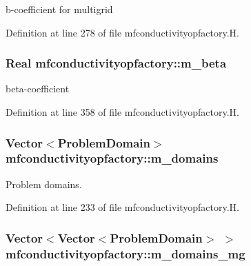 b-\/coefficient for multigrid 



Definition at line 278 of file mfconductivityopfactory.\+H.

\subsubsection[{\texorpdfstring{m\+\_\+beta}{m_beta}}]{\setlength{\rightskip}{0pt plus 5cm}Real mfconductivityopfactory\+::m\+\_\+beta\hspace{0.3cm}{\ttfamily [protected]}}\hypertarget{classmfconductivityopfactory_a84e9034b87544fd055c7568f69e6e1d6}{}\label{classmfconductivityopfactory_a84e9034b87544fd055c7568f69e6e1d6}


beta-\/coefficient 



Definition at line 358 of file mfconductivityopfactory.\+H.

\subsubsection[{\texorpdfstring{m\+\_\+domains}{m_domains}}]{\setlength{\rightskip}{0pt plus 5cm}Vector$<$Problem\+Domain$>$ mfconductivityopfactory\+::m\+\_\+domains\hspace{0.3cm}{\ttfamily [protected]}}\hypertarget{classmfconductivityopfactory_a7f808b27a90660d2912fd5c47da676f4}{}\label{classmfconductivityopfactory_a7f808b27a90660d2912fd5c47da676f4}


Problem domains. 



Definition at line 233 of file mfconductivityopfactory.\+H.

\subsubsection[{\texorpdfstring{m\+\_\+domains\+\_\+mg}{m_domains_mg}}]{\setlength{\rightskip}{0pt plus 5cm}Vector$<$Vector$<$Problem\+Domain$>$ $>$ mfconductivityopfactory\+::m\+\_\+domains\+\_\+mg\hspace{0.3cm}{\ttfamily [protected]}}\hypertarget{classmfconductivityopfactory_a5b9677838aa95269146a6d13b0e59056}{}\label{classmfconductivityopfactory_a5b9677838aa95269146a6d13b0e59056}


